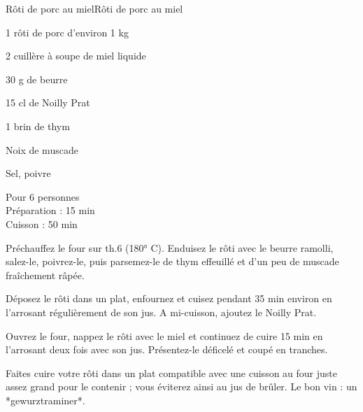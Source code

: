 \begin{recette}{Rôti de porc au miel}{Rôti de porc au miel}

\begin{ingredients}
1 rôti de porc d’environ 1 kg\par
2 cuillère à soupe de miel liquide\par
	30 g de beurre\par
	15 cl de Noilly Prat\par
1 brin de thym\par
Noix de muscade\par
Sel, poivre\par
\end{ingredients}

\begin{infos}
Pour 6 personnes\\
Préparation : 15 min	\\
Cuisson : 50 min\\
\end{infos}

\begin{etapes}
\item Préchauffez le four sur th.6 (180° C). Enduisez le rôti avec le beurre ramolli, salez-le, poivrez-le, puis parsemez-le de thym effeuillé et d’un peu de muscade fraîchement  râpée.
\item Déposez le rôti dans un plat, enfournez et cuisez pendant 35 min environ en l’arrosant régulièrement de son jus. A mi-cuisson, ajoutez le Noilly Prat.
\item Ouvrez le four, nappez le rôti avec le miel et continuez de cuire 15 min en l’arrosant deux fois avec son jus. Présentez-le déficelé et coupé en tranches.
\end{etapes}

\begin{conseils}
Faites cuire votre rôti dans un plat compatible avec une cuisson au four juste assez grand pour le contenir ; vous éviterez ainsi au jus de brûler.
Le bon vin : un *gewurztraminer*.
\end{conseils}

\end{recette}